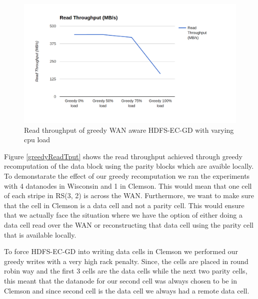 \documentclass{sig-alternate-05-2015}
\begin{document}
\begin{figure}

\centering
\includegraphics[scale=0.21]{stress.png}
\caption{Read throughput of greedy WAN aware HDFS-EC-GD with varying cpu load}
\label{stress}
\end{figure}
Figure \ref{greedyReadTput} shows the read throughput achieved through greedy recomputation of the data block using the parity blocks which are avaible locally. To demonstarate the effect of our greedy recomputation we ran the experiments with 4 datanodes in Wisconsin and 1 in Clemson. This would mean that one cell of each stripe in RS(3, 2) is across the WAN. Furthermore, we want to make sure that the cell in Clemson is a data cell and not a parity cell. This would ensure that we actually face the situation where we have the option of either doing a data cell read over the WAN or reconstructing that data cell using the parity cell that is available locally. 

To force HDFS-EC-GD into writing data cells in Clemson we performed our greedy writes with a very high rack penalty. Since, the cells are placed in round robin way and the first 3 cells are the data cells while the next two parity cells, this meant that the datanode for our second cell was always chosen to be in Clemson and since second cell is the data cell we always had a remote data cell.  
\end{document}
